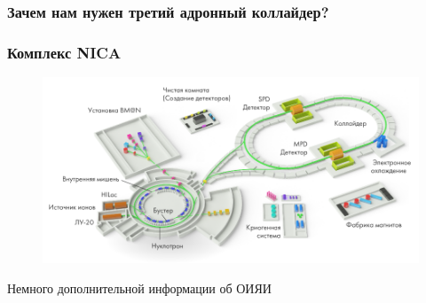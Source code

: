 \documentclass[dvipsnames] {beamer}
\begin{document}
\begin{frame}
  \frametitle{\bf \centering Зачем нам нужен третий адронный коллайдер?}

\end{frame}


\begin{frame}
  \frametitle{\bf \centering Комплекс NICA}
   \begin{block}{}
     \begin{figure}[H]
       \includegraphics[width=1.\linewidth]{NICA_complex-ru.png}
     \end{figure}
   \end{block}

\end{frame}


\begin{frame}
  \bf
  \begin{center}
    \Huge{Немного дополнительной информации об ОИЯИ}
  \end{center}
\end{frame}
\end{document}
